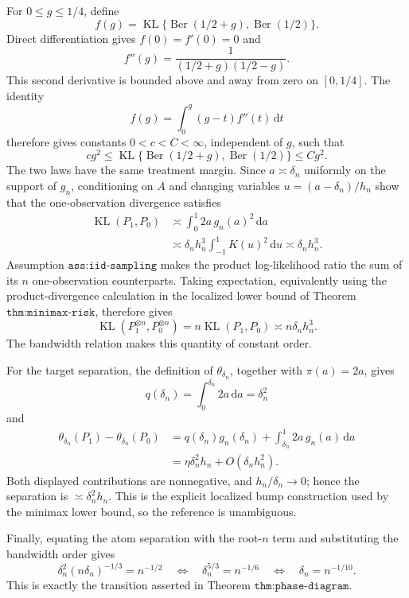 For \(0\leq g\leq1/4\), define
\[
 f(g)=\operatorname{KL}\{\operatorname{Ber}(1/2+g),\operatorname{Ber}(1/2)\}.
\]
Direct differentiation gives \(f(0)=f'(0)=0\) and
\[
 f''(g)=\frac{1}{(1/2+g)(1/2-g)}.
\]
This second derivative is bounded above and away from zero on \([0,1/4]\).  The identity
\[
 f(g)=\int_0^g(g-t)f''(t)\,\mathrm dt
\]
therefore gives constants \(0<c<C<\infty\), independent of \(g\), such that
\[
 c g^2\leq
 \operatorname{KL}\{\operatorname{Ber}(1/2+g),\operatorname{Ber}(1/2)\}
 \leq Cg^2.
\]
The two laws have the same treatment margin.  Since \(a\asymp\delta_n\) uniformly on the support of \(g_n\), conditioning on \(A\) and changing variables \(u=(a-\delta_n)/h_n\) show that the one-observation divergence satisfies
\[
 \begin{aligned}
 \operatorname{KL}(P_1,P_0)
 &\asymp \int_0^1 2a\,g_n(a)^2\,\mathrm da \\
 &\asymp \delta_n h_n^3
 \int_{-1}^1K(u)^2\,\mathrm du
 \asymp\delta_nh_n^3.
 \end{aligned}
\]
Assumption \(\texttt{ass:iid-sampling}\) makes the product log-likelihood ratio the sum of its \(n\) one-observation counterparts.  Taking expectation, equivalently using the product-divergence calculation in the localized lower bound of Theorem \(\texttt{thm:minimax-risk}\), therefore gives
\[
 \operatorname{KL}(P_1^{\otimes n},P_0^{\otimes n})
 =n\operatorname{KL}(P_1,P_0)
 \asymp n\delta_nh_n^3.
\]
The bandwidth relation makes this quantity of constant order.

For the target separation, the definition of \(\theta_{\delta_n}\), together with \(\pi(a)=2a\), gives
\[
 q(\delta_n)=\int_0^{\delta_n}2a\,\mathrm da=\delta_n^2
\]
and
\[
 \begin{aligned}
 \theta_{\delta_n}(P_1)-\theta_{\delta_n}(P_0)
 &=q(\delta_n)g_n(\delta_n)
   +\int_{\delta_n}^1 2a\,g_n(a)\,\mathrm da \\
 &=\eta\delta_n^2h_n+O(\delta_nh_n^2).
 \end{aligned}
\]
Both displayed contributions are nonnegative, and \(h_n/\delta_n\to0\); hence the separation is \(\asymp\delta_n^2h_n\).  This is the explicit localized bump construction used by the minimax lower bound, so the reference is unambiguous.

Finally, equating the atom separation with the root-\(n\) term and substituting the bandwidth order gives
\[
 \delta_n^2(n\delta_n)^{-1/3}=n^{-1/2}
 \quad\Longleftrightarrow\quad
 \delta_n^{5/3}=n^{-1/6}
 \quad\Longleftrightarrow\quad
 \delta_n=n^{-1/10}.
\]
This is exactly the transition asserted in Theorem \(\texttt{thm:phase-diagram}\).